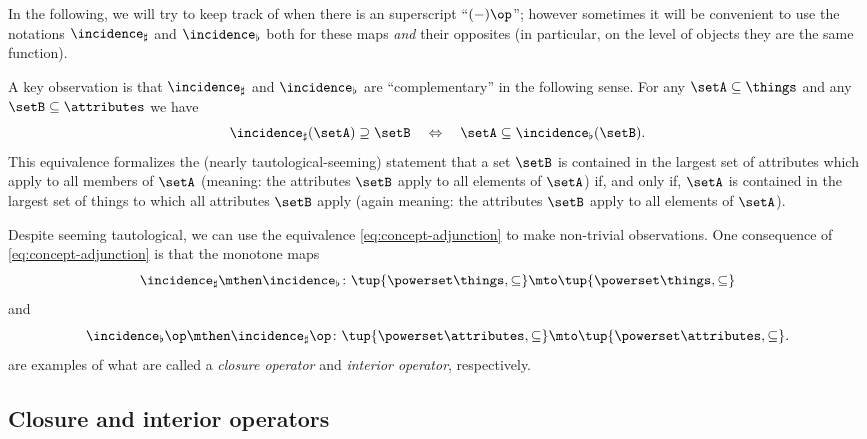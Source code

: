 In the following, we will try to keep track of when there is an superscript ``$( - )\op $''; however sometimes it will be convenient to use the notations $\incidence_\sharp$ and $\incidence_\flat$ both for these maps \emph{and} their opposites (in particular, on the level of objects they are the same function).

A key observation is that $\incidence_\sharp$ and $\incidence_\flat$ are ``complementary'' in the following sense.
For any $\setA \subseteq \things$ and any $\setB \subseteq \attributes$ we have
\begin{equation}\label{eq:concept-adjunction}
    \incidence_\sharp(\setA) \supseteq \setB \quad \Leftrightarrow \quad \setA \subseteq \incidence_\flat(\setB).
\end{equation}
This equivalence formalizes the (nearly tautological-seeming) statement that a set $\setB$ is contained in the largest set of attributes which apply to all members of $\setA$ (meaning: the attributes $\setB$ apply to all elements of $\setA$) if, and only if, $\setA$ is contained in the largest set of things to which all attributes $\setB$ apply (again meaning: the attributes $\setB$ apply to all elements of $\setA$).

Despite seeming tautological, we can use the equivalence \cref{eq:concept-adjunction} to make non-trivial observations.
One consequence of \cref{eq:concept-adjunction} is that the monotone maps
\begin{equation}\label{eq:fca-closure-operator-things}
    \incidence_\sharp \mthen \incidence_\flat \colon \tup{\powerset \things, \subseteq} \mto \tup{\powerset \things, \subseteq}
\end{equation}
and
\begin{equation}\label{eq:fca-closure-operator-attributes}
    \incidence_\flat\op \mthen \incidence_\sharp\op \colon \tup{\powerset \attributes, \subseteq} \mto \tup{\powerset \attributes, \subseteq}.
\end{equation}
are examples of what are called a \emph{closure operator} and \emph{interior operator}, respectively.

\subsection{Closure and interior operators}


